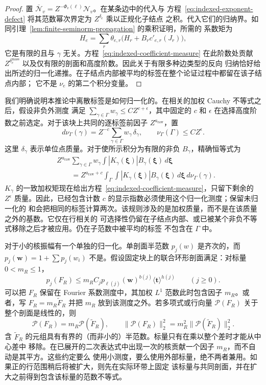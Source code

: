 \begin{proof}
置 $\overline{\mathcal N}_v=Z^{-\Phi_v(\boldsymbol\ell)}\mathcal N_v$。在某条边中的代入与
方程~\eqref{eq:indexed-exponent-defect} 将其范数幂次界定为 $Z^{\delta_e}$ 乘以正规化子结点
之积。代入它们的归纳界。如同引理~\ref{lem:finite-seminorm-propagation} 的乘积证明，所需的
系数矩为
\[
 H_e=\sum_r\theta_{e,r}
              \bigl(H_r+B_r c'_{e,r}(J_r)\bigr),
\]
它是有限的且与 $\gamma$ 无关。方程~\eqref{eq:indexed-coefficient-measure} 在此阶数处贡献
$Z^{\delta_e^{\mathrm{mass}}}$ 以及仅有限的剖面和高度阶数。因此关于有限多种边类型的反向
归纳恰好给出所述的归一化递推。在子结点内部被平均的标签在整个论证过程中都留在该子结点内部；
它不是 $\nu_e$ 的第二个积分变量。
\end{proof}

我们明确说明本推论中离散标签是如何归一化的。在相关的加权 Cauchy 不等式之后，假设非负外测度
满足 $\sum_{\gamma\in\Gamma}w_\gamma\le C Z^{c+\epsilon}$，其中固定的 $c$ 和 $\epsilon$
在选择高度阶数之前选定。对于该块上共同的逐标签前因子 $Z^{a_{\mathrm{raw}}}$，置
\[
 d\nu_\Gamma(\gamma)=Z^{-c}
             \sum_{\gamma\in\Gamma}w_\gamma\,\delta_\gamma,
 \qquad \nu_\Gamma(\Gamma)\le C Z^\epsilon.
\]
这里 $\delta_\gamma$ 表示单位点质量。对于使所示积分为有限的非负 $B_\gamma$，精确恒等式为
\begin{equation}\label{eq:normalized-label-measure}
 \begin{split}
 &Z^{a_{\mathrm{raw}}}\sum_{\gamma\in\Gamma}w_\gamma
              \int |K_\gamma(\boldsymbol\xi)|B_\gamma(\boldsymbol\xi)
                                      \,d\boldsymbol\xi\\
 &\qquad=Z^{a_{\mathrm{raw}}+c}
       \int_\Gamma\int |K_\gamma(\boldsymbol\xi)|B_\gamma(\boldsymbol\xi)
                                      \,d\boldsymbol\xi\,d\nu_\Gamma(\gamma).
 \end{split}
\end{equation}
$K_\gamma$ 的一致加权矩现在给出方程~\eqref{eq:indexed-coefficient-measure}，只留下剩余的
$Z^\epsilon$ 质量。因此，已经包含计数 $c$ 的显示指数必须使用这个归一化测度；保留未归一化的
和会把相同的标签计算两次。该规则涉及的是加权质量，而不是在该质量之外的基数。它仅在行相关的
可选择性仍留在子结点内部、或已被某个非负不等式移除之后才被应用。仍在子范数中被平均的标签
不包含在 $\Gamma$ 中。

对于小的核振幅有一个单独的归一化。单剖面半范数 $p_j(w)$ 是齐次的，而
$p_j(\boldsymbol w)=1+\sum p_j(w_i)$ 不是。假设固定块上的联合环形剖面满足：对标量
$0<m_R\le1$，
\[
 p_j(F_R)\le m_R C_j p_{\ell(j)}(\boldsymbol w)^{b(j)}
                         \langle\boldsymbol t\rangle^{h(j)}
       \qquad(j\ge0).
\]
可以把 $F_R$ 保留在 Fourier 系数测度中，其加权 $L^1$ 范数此时包含因子 $m_R$。或者，写
$F_R=m_R\widetilde F_R$ 并把 $m_R$ 放到该测度之外。若多项式或行向量 $\mathcal P(F_R)$
关于整个剖面是线性的，则
\[
 \mathcal P(F_R)=m_R\mathcal P(\widetilde F_R),\qquad
 \|\mathcal P(F_R)\|_2^2=m_R^2\|\mathcal P(\widetilde F_R)\|_2^2.
\]
含 $\widetilde F_R$ 的元组具有有界的（而非小的）半范数。标量只有在乘以整个差时才能从中心差中
移除。在已展开的二次表达式中出现一次的核贡献一个因子 $m_R$，而不自动是其平方。这些约定要么
使用小测度，要么使用外部标量，绝不两者兼用。如果正的行范围稍后将被扩大，则先在实际环带上固定
该标量与共同剖面，并在扩大之前得到包含该标量的范数不等式。

